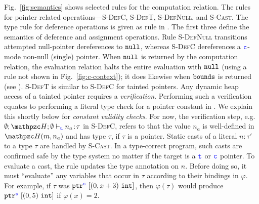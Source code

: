 Fig.~\ref{fig:semantics} shows selected rules for the computation relation.
The rules for pointer related operations---\textsc{S-DefC},
\textsc{S-DefT}, \textsc{S-DefNull}, and \textsc{S-Cast}.
The type rule for deference operations is given as rule  in .
The first three define the semantics of deference and assignment operations.
Rule \textsc{S-DefNull} transitions attempted null-pointer
dereferences to $\mathtt{null}$, whereas \textsc{S-DefC} dereferences a $\textcolor{blue}{\texttt{c}}$-mode
non-null (single) pointer.
When $\mathtt{null}$ is returned by the
computation relation, the evaluation relation halts the entire
evaluation with $\mathtt{null}$ (using a rule not shown in Fig.~\ref{fig:c-context}); it
does likewise when $\mathtt{bounds}$ is returned (see ).
\textsc{S-DefT} is similar to \textsc{S-DefC} for tainted pointers.
Any dynamic heap access of a tainted pointer requires a \textit{verification}.
Performing such a verification equates to performing a literal type check for a pointer constant in .
We explain this shortly below for \emph{constant validity checks}.
For now, the verification step, e.g. $\emptyset;\heap ; \emptyset \vdash_{\umode}\evalue{n_a}{\tau}$ in \textsc{S-DefC},
refers to that the value $n_a$ is well-defined in $\heap(m,n_a)$ and has type $\tau$, if $\tau$ is a pointer.
Static casts of a literal $n\!:\!\tau'$ to a type $\tau$ are handled
by \textsc{S-Cast}. In a type-correct program, such casts are
confirmed safe by the type system no matter
if the target is a $\textcolor{blue}{\texttt{t}}$ or $\textcolor{blue}{\texttt{c}}$ pointer. To evaluate a cast, the rule
updates the type annotation on $n$. Before doing so, it must
``evaluate'' any variables that occur in $\tau$ according to their
bindings in $\varphi$. For example, if $\tau$ was
${\mathtt{ptr}^{\textcolor{blue}{\texttt{c}}}~{[{({0},{x+3})}~{\mathtt{int}}]}}$, then $\varphi(\tau)$ would
produce ${\mathtt{ptr}^{\textcolor{blue}{\texttt{c}}}~{[{({0},{5})}~{\mathtt{int}}]}}$ if $\varphi(x) = 2$.




